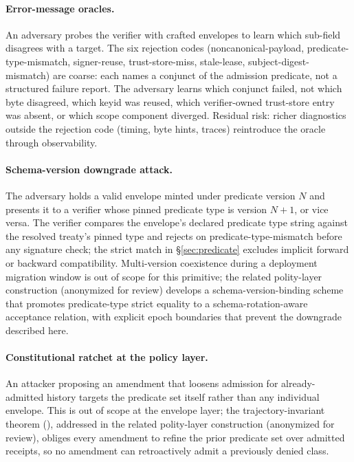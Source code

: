\paragraph{Error-message oracles.} An adversary probes the verifier with crafted envelopes to learn which sub-field disagrees with a target. The six rejection codes (noncanonical-payload, predicate-type-mismatch, signer-reuse, trust-store-miss, stale-lease, subject-digest-mismatch) are coarse: each names a conjunct of the admission predicate, not a structured failure report. The adversary learns which conjunct failed, not which byte disagreed, which keyid was reused, which verifier-owned trust-store entry was absent, or which scope component diverged. Residual risk: richer diagnostics outside the rejection code (timing, byte hints, traces) reintroduce the oracle through observability.

\paragraph{Schema-version downgrade attack.} The adversary holds a valid envelope minted under predicate version $N$ and presents it to a verifier whose pinned predicate type is version $N{+}1$, or vice versa. The verifier compares the envelope's declared predicate type string against the resolved treaty's pinned type and rejects on predicate-type-mismatch before any signature check; the strict match in \S\ref{sec:predicate} excludes implicit forward or backward compatibility. Multi-version coexistence during a deployment migration window is out of scope for this primitive; the related polity-layer construction (anonymized for review) develops a schema-version-binding scheme that promotes predicate-type strict equality to a schema-rotation-aware acceptance relation, with explicit epoch boundaries that prevent the downgrade described here.

\paragraph{Constitutional ratchet at the policy layer.} An attacker proposing an amendment that loosens admission for already-admitted history targets the predicate set itself rather than any individual envelope. This is out of scope at the envelope layer; the trajectory-invariant theorem (), addressed in the related polity-layer construction (anonymized for review), obliges every amendment to refine the prior predicate set over admitted receipts, so no amendment can retroactively admit a previously denied class.
